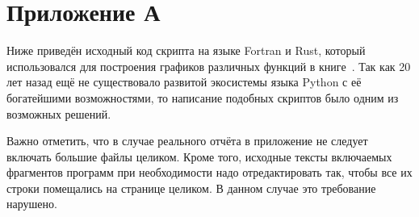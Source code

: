 \section{Приложение А}

Ниже приведён исходный код скрипта на языке Fortran и Rust, который использовался для
построения графиков различных функций в книге~\cite{roganov-jurists}.
Так как 20 лет назад ещё не существовало развитой экосистемы языка Python
с её богатейшими возможностями, то написание подобных скриптов было одним
из возможных решений.

Важно отметить, что в случае реального отчёта в приложение не следует включать
большие файлы целиком. Кроме того, исходные тексты включаемых фрагментов
программ при необходимости надо отредактировать так, чтобы все их строки
помещались на странице целиком. В данном случае это требование нарушено.



